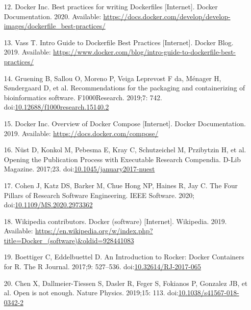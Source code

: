 \documentclass[10pt,letterpaper]{article}
\begin{document}
\leavevmode\hypertarget{ref-docker_inc_best_2020}{}%
12. Docker Inc. Best practices for writing Dockerfiles {[}Internet{]}.
Docker Documentation. 2020. Available:
\url{https://docs.docker.com/develop/develop-images/dockerfile_best-practices/}

\leavevmode\hypertarget{ref-vass_intro_2019}{}%
13. Vass T. Intro Guide to Dockerfile Best Practices {[}Internet{]}.
Docker Blog. 2019. Available:
\url{https://www.docker.com/blog/intro-guide-to-dockerfile-best-practices/}

\leavevmode\hypertarget{ref-gruening_recommendations_2019}{}%
14. Gruening B, Sallou O, Moreno P, Veiga Leprevost F da, Ménager H,
Søndergaard D, et al. Recommendations for the packaging and
containerizing of bioinformatics software. F1000Research. 2019;7: 742.
doi:\href{https://doi.org/10.12688/f1000research.15140.2}{10.12688/f1000research.15140.2}

\leavevmode\hypertarget{ref-docker-compose_2019}{}%
15. Docker Inc. Overview of Docker Compose {[}Internet{]}. Docker
Documentation. 2019. Available: \url{https://docs.docker.com/compose/}

\leavevmode\hypertarget{ref-nust_opening_2017}{}%
16. Nüst D, Konkol M, Pebesma E, Kray C, Schutzeichel M, Przibytzin H,
et al. Opening the Publication Process with Executable Research
Compendia. D-Lib Magazine. 2017;23.
doi:\href{https://doi.org/10.1045/january2017-nuest}{10.1045/january2017-nuest}

\leavevmode\hypertarget{ref-cohen_four_2020}{}%
17. Cohen J, Katz DS, Barker M, Chue Hong NP, Haines R, Jay C. The Four
Pillars of Research Software Engineering. IEEE Software. 2020;
doi:\href{https://doi.org/10.1109/MS.2020.2973362}{10.1109/MS.2020.2973362}

\leavevmode\hypertarget{ref-wikipedia_contributors_docker_2019}{}%
18. Wikipedia contributors. Docker (software) {[}Internet{]}. Wikipedia.
2019. Available:
\url{https://en.wikipedia.org/w/index.php?title=Docker_(software)\&oldid=928441083}

\leavevmode\hypertarget{ref-boettiger_introduction_2017}{}%
19. Boettiger C, Eddelbuettel D. An Introduction to Rocker: Docker
Containers for R. The R Journal. 2017;9: 527--536.
doi:\href{https://doi.org/10.32614/RJ-2017-065}{10.32614/RJ-2017-065}

\leavevmode\hypertarget{ref-chen_open_2019}{}%
20. Chen X, Dallmeier-Tiessen S, Dasler R, Feger S, Fokianos P, Gonzalez
JB, et al. Open is not enough. Nature Physics. 2019;15: 113.
doi:\href{https://doi.org/10.1038/s41567-018-0342-2}{10.1038/s41567-018-0342-2}
\end{document}
